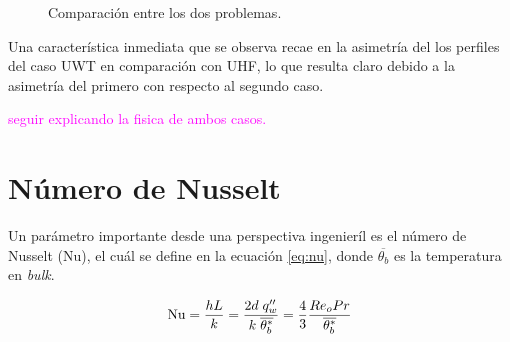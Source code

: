 \begin{figure}[H]
  \centering
  \caption{Comparación entre los dos problemas.}
  \label{fig:ux-guocomp}
\end{figure}


Una característica inmediata que se observa recae en la asimetría del los perfiles del caso UWT en comparación con UHF, lo que resulta claro debido a la asimetría del primero con respecto al segundo caso. 


\textcolor{magenta}{seguir explicando la fisica de ambos casos.}



\newpage
\section{Número de Nusselt} \label{sec:nu}

Un parámetro importante desde una perspectiva ingenieríl es el número de Nusselt (Nu), el cuál se define en la ecuación \ref{eq:nu}, donde $\overline{\theta_b}$ es la temperatura en \textit{bulk}.

\begin{equation}
\text{Nu} = \frac{h L}{k} = \frac{2d \hspace*{1mm} q''_w}{k \hspace*{1mm} \overline{\theta^*_b}} = \frac{4}{3} \frac{Re_o Pr}{\overline{\theta^*_b}}	
\label{eq:nu}
\end{equation}

